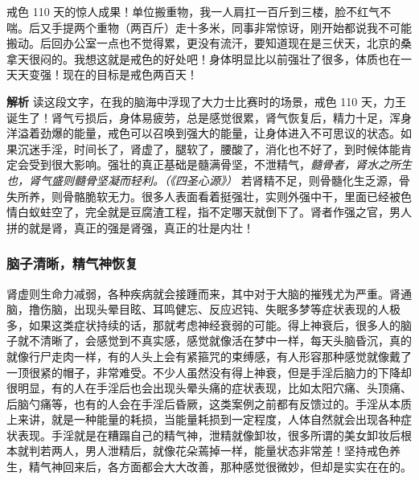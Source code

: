 \begin{case}
    戒色 110 天的惊人成果！单位搬重物，我一人肩扛一百斤到三楼，脸不红气不喘。后又手提两个重物（两百斤）走十多米，同事非常惊讶，刚开始都说我不可能搬动。后回办公室一点也不觉得累，更没有流汗，要知道现在是三伏天，北京的桑拿天很闷的。我想这就是戒色的好处吧！身体明显比以前强壮了很多，体质也在一天天变强！现在的目标是戒色两百天！

    \textbf{解析} 读这段文字，在我的脑海中浮现了大力士比赛时的场景，戒色 110 天，力王诞生了！肾气亏损后，身体易疲劳，总是感觉很累，肾气恢复后，精力十足，浑身洋溢着劲爆的能量，戒色可以召唤到强大的能量，让身体进入不可思议的状态。如果沉迷手淫，时间长了，肾虚了，腿软了，腰酸了，消化也不好了，到时候体能肯定会受到很大影响。强壮的真正基础是髓满骨坚，不泄精气，\textit{髓骨者，肾水之所生也，肾气盛则髓骨坚凝而轻利。（《四圣心源》）} 若肾精不足，则骨髓化生乏源，骨失所养，则骨骼脆软无力。很多人表面看着挺强壮，实则外强中干，里面已经被色情白蚁蛀空了，完全就是豆腐渣工程，指不定哪天就倒下了。肾者作强之官，男人拼的就是肾，真正的强是肾强，真正的壮是内壮！
\end{case}

\subsubsection{脑子清晰，精气神恢复}

肾虚则生命力减弱，各种疾病就会接踵而来，其中对于大脑的摧残尤为严重。肾通脑，撸伤脑，出现头晕目眩、耳鸣健忘、反应迟钝、失眠多梦等症状表现的人极多，如果这类症状持续的话，那就考虑神经衰弱的可能。得上神衰后，很多人的脑子就不清晰了，会感觉到不真实感，感觉就像活在梦中一样，每天头脑昏沉，真的就像行尸走肉一样，有的人头上会有紧箍咒的束缚感，有人形容那种感觉就像戴了一顶很紧的帽子，非常难受。不少人虽然没有得上神衰，但是手淫后脑力的下降却很明显，有的人在手淫后也会出现头晕头痛的症状表现，比如太阳穴痛、头顶痛、后脑勺痛等，也有的人会在手淫后昏厥，这类案例之前都有反馈过的。手淫从本质上来讲，就是一种能量的耗损，当能量耗损到一定程度，人体自然就会出现各种症状表现。手淫就是在糟蹋自己的精气神，泄精就像卸妆，很多所谓的美女卸妆后根本就判若两人，男人泄精后，就像花朵蔫掉一样，能量状态非常差！坚持戒色养生，精气神回来后，各方面都会大大改善，那种感觉很微妙，但却是实实在在的。

